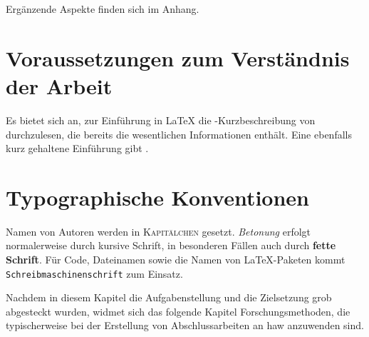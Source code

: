 Ergänzende Aspekte finden sich im Anhang.

\section{Voraussetzungen zum Verständnis der Arbeit}
\label{sec:Einl-Voraussetzungen}
%
Es bietet sich an, zur Einführung in \LaTeX{} die \LaTeXe{}-Kurzbeschreibung von \textcite{Daniel2018} 
durchzulesen, die bereits die wesentlichen Informationen enthält. Eine ebenfalls kurz gehaltene Einführung
gibt \textcite{Gitter2018}.

\section{Typographische Konventionen}
\label{sec:Einl-Typographie}
%
Namen von Autoren werden in \textsc{Kapitälchen} gesetzt. \emph{Betonung} erfolgt normalerweise durch kursive
Schrift, in besonderen Fällen auch durch \textbf{fette Schrift}. Für Code, Dateinamen sowie die Namen von
\LaTeX{}-Paketen kommt \texttt{Schreibmaschinenschrift} zum Einsatz.

Nachdem in diesem Kapitel die Aufgabenstellung und die Zielsetzung grob abgesteckt wurden, widmet sich das
folgende Kapitel Forschungsmethoden, die typischerweise bei der Erstellung von Abschlussarbeiten an
\gls{haw} anzuwenden sind.